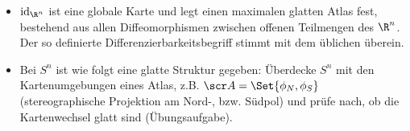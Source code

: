 \begin{itemize}
    \item
        $\id_{\R^n}$ ist eine globale Karte und legt einen maximalen glatten Atlas fest, bestehend aus allen Diffeomorphismen zwischen offenen Teilmengen des $\R^n$.
        Der so definierte Differenzierbarkeitsbegriff stimmt mit dem üblichen überein.
    \item
        Bei $S^n$ ist wie folgt eine glatte Struktur gegeben:
        Überdecke $S^n$ mit den Kartenumgebungen eines Atlas, z.B. $\scr A = \Set{\phi_N, \phi_S}$ (stereographische Projektion am Nord-, bzw. Südpol) und prüfe nach, ob die Kartenwechsel glatt sind (Übungsaufgabe).
\end{itemize}





